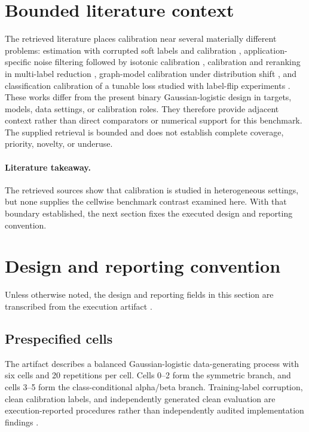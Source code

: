 \documentclass{article}
\begin{document}
\section{Bounded literature context}
The retrieved literature places calibration near several materially different problems: estimation with corrupted soft labels and calibration \cite{RetrievedW4415036265},%
application-specific noise filtering followed by isotonic calibration \cite{RetrievedW7154992691},%
calibration and reranking in multi-label reduction \cite{RetrievedW3003430727},%
graph-model calibration under distribution shift \cite{RetrievedW7168433868},%
and classification calibration of a tunable loss studied with label-flip experiments \cite{RetrievedW4288335971}.%
These works differ from the present binary Gaussian-logistic design in targets, models, data settings, or calibration roles. They therefore provide adjacent context rather than direct comparators or numerical support for this benchmark. The supplied retrieval is bounded and does not establish complete coverage, priority, novelty, or underuse.

\paragraph{Literature takeaway.} The retrieved sources show that calibration is studied in heterogeneous settings, but none supplies the cellwise benchmark contrast examined here. With that boundary established, the next section fixes the executed design and reporting convention.

\section{Design and reporting convention}
Unless otherwise noted, the design and reporting fields in this section are transcribed from the execution artifact \cite{exec}.

\subsection{Prespecified cells}
The artifact describes a balanced Gaussian-logistic data-generating process with six cells and 20 repetitions per cell. Cells 0--2 form the symmetric branch, and cells 3--5 form the class-conditional alpha/beta branch. Training-label corruption, clean calibration labels, and independently generated clean evaluation are execution-reported procedures rather than independently audited implementation findings \cite{exec}.
\end{document}
